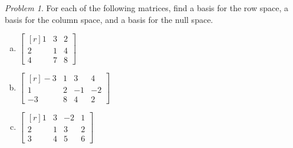 \documentclass[12pt, letterpaper]{article}
\theoremstyle{remark}
\newtheorem{problem}{Problem}
\theoremstyle{remark}
\begin{document}
\begin{problem}

For each of the following matrices, find a basis
for the row space, a basis for the column space,
and a basis for the null space.
\begin{enumerate}[(a)]

	\item \(
	      \begin{bmatrix*}[r]
		      1 & 3 & 2 \\
		      2 & 1 & 4 \\
		      4 & 7 & 8
	      \end{bmatrix*}
	      \)

	\item \(
	      \begin{bmatrix*}[r]
		      −3 & 1 & 3 & 4 \\
		      1 & 2 & −1 & −2 \\
		      −3 & 8 & 4 & 2
	      \end{bmatrix*}
	      \)

	\item \(
	      \begin{bmatrix*}[r]
		      1 & 3 & −2 & 1 \\
		      2 & 1 & 3 & 2 \\
		      3 & 4 & 5 & 6
	      \end{bmatrix*}
	      \)

\end{enumerate}

\end{problem}
\end{document}
